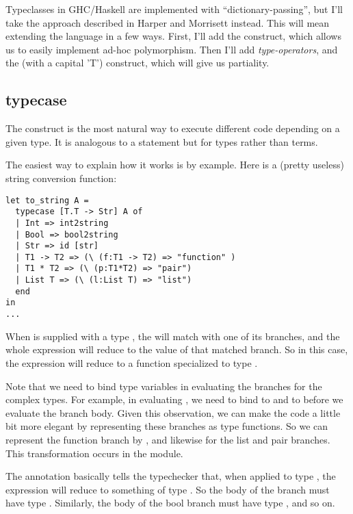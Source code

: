 \documentclass[pageno]{jpaper}
\begin{document}
{{{Typeclasses in GHC/Haskell are implemented with ``dictionary-passing'', but I'll take the approach described
in Harper and Morrisett \cite{harper-typecase} instead. This will mean extending the language in a few ways.  First, I'll add the
 construct, which allows us to easily implement ad-hoc polymorphism. Then I'll add
\textit{type-operators}, and the  (with a capital 'T') construct, which will give us
partiality.

\subsection{typecase}
The  construct is the most natural way to execute different code depending on a
given type. It is analogous to a  statement but for types rather than terms.

The easiest way to explain how it works is by example. Here is a (pretty useless) string conversion function:

\begin{lstlisting}[mathescape]
let to_string A =
  typecase [T.T -> Str] A of
  | Int => int2string
  | Bool => bool2string
  | Str => id [str]
  | T1 -> T2 => (\ (f:T1 -> T2) => "function" )
  | T1 * T2 => (\ (p:T1*T2) => "pair")
  | List T => (\ (l:List T) => "list")
  end
in
...
\end{lstlisting}

When  is supplied with a type , the  will match 
with one of its branches, and the whole expression will reduce to the value of that matched branch.
So in this case, the expression will reduce to a  function specialized to
type .

Note that we need to bind type variables in evaluating the branches for the complex types. For example,
in evaluating , we need to bind  to  and  to  before we evaluate the branch body. 
Given this observation, we can make the code a little bit more elegant
by representing these branches as type functions. So we can represent the function branch by
, and likewise for the list and pair branches. This transformation
occurs in the  module.

The annotation \lsti{[T.T -> Str]} basically tells the typechecker that, when applied to type \lsti{[T]}, the  expression will reduce to something of type . 
So the body of the  branch must have type .
Similarly, the body of the bool branch must have type , and so on.

}}}
\end{document}

